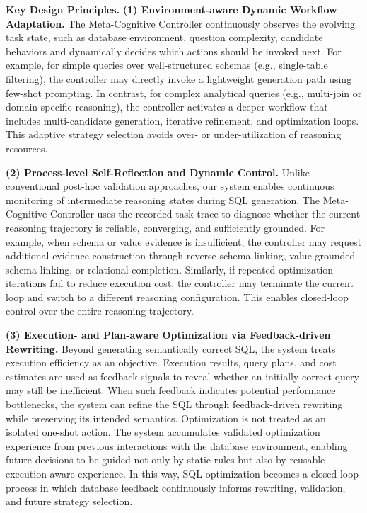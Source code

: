 \textbf{Key Design Principles.}
\textbf{(1) Environment-aware Dynamic Workflow Adaptation.}
The Meta-Cognitive Controller continuously observes the evolving task state, such as database environment, question complexity, candidate behaviors and dynamically decides which actions should be invoked next.
For example, for simple queries over well-structured schemas (e.g., single-table filtering), the controller may directly invoke a lightweight generation path using few-shot prompting.
In contrast, for complex analytical queries (e.g., multi-join or domain-specific reasoning), the controller activates a deeper workflow that includes multi-candidate generation, iterative refinement, and optimization loops.
This adaptive strategy selection avoids over- or under-utilization of reasoning resources.

\textbf{(2) Process-level Self-Reflection and Dynamic Control.}
Unlike conventional post-hoc validation approaches, our system enables continuous monitoring of intermediate reasoning states during SQL generation.
The Meta-Cognitive Controller uses the recorded task trace to diagnose whether the current reasoning trajectory is reliable, converging, and sufficiently grounded.
For example, when schema or value evidence is insufficient, the controller may request additional evidence construction through reverse schema linking, value-grounded schema linking, or relational completion.
Similarly, if repeated optimization iterations fail to reduce execution cost, the controller may terminate the current loop and switch to a different reasoning configuration.
This enables closed-loop control over the entire reasoning trajectory.

\textbf{(3) Execution- and Plan-aware Optimization via Feedback-driven Rewriting.}
Beyond generating semantically correct SQL, the system treats execution efficiency as an objective.
Execution results, query plans, and cost estimates are used as feedback signals to reveal whether an initially correct query may still be inefficient.
When such feedback indicates potential performance bottlenecks, the system can refine the SQL through feedback-driven rewriting while preserving its intended semantics.
Optimization is not treated as an isolated one-shot action.
The system accumulates validated optimization experience from previous interactions with the database environment, enabling future decisions to be guided not only by static rules but also by reusable execution-aware experience.
In this way, SQL optimization becomes a closed-loop process in which database feedback continuously informs rewriting, validation, and future strategy selection.


\endgroup
